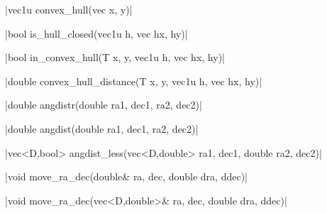 \funcitem \cppinline|vec1u convex_hull(vec x, y)| 

\funcitem \cppinline|bool is_hull_closed(vec1u h, vec hx, hy)| 

\funcitem \vectorfunc \cppinline|bool in_convex_hull(T x, y, vec1u h, vec hx, hy)| 

\funcitem \vectorfunc \cppinline|double convex_hull_distance(T x, y, vec1u h, vec hx, hy)| 

\funcitem \vectorfunc \cppinline|double angdistr(double ra1, dec1, ra2, dec2)| 

\vectorfunc \cppinline|double angdist(double ra1, dec1, ra2, dec2)| 

\funcitem \cppinline|vec<D,bool> angdist_less(vec<D,double> ra1, dec1, double ra2, dec2)| 

\funcitem \cppinline|void move_ra_dec(double& ra, dec, double dra, ddec)| 

\cppinline|void move_ra_dec(vec<D,double>& ra, dec, double dra, ddec)|
